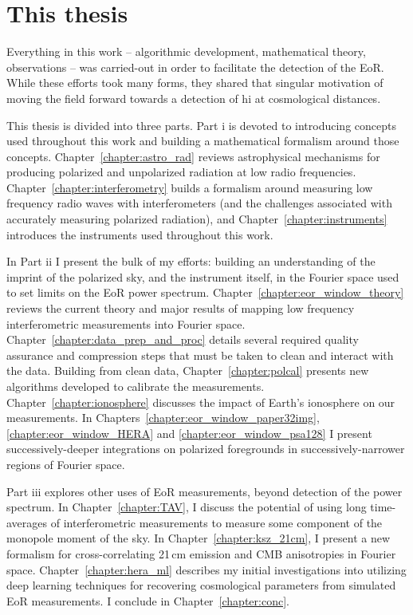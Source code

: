 

\section{This thesis}
\label{sec:eor_intro_this_thesis}
Everything in this work -- algorithmic development, mathematical theory, observations -- was carried-out in order to facilitate the detection of the EoR. While these efforts took many forms, they shared that singular motivation of moving the field forward towards a detection of {\sc hi} at cosmological distances. 

This thesis is divided into three parts. Part {\sc i} is devoted to introducing concepts used throughout this work and building a mathematical formalism around those concepts. 
Chapter~\ref{chapter:astro_rad} reviews astrophysical mechanisms for producing polarized and unpolarized radiation at low radio frequencies. 
Chapter~\ref{chapter:interferometry} builds a formalism around measuring low frequency radio waves with interferometers (and the challenges associated with accurately measuring polarized radiation), and Chapter~\ref{chapter:instruments} introduces the instruments used throughout this work.

In Part {\sc ii} I present the bulk of my efforts: building an understanding of the imprint of the polarized sky, and the instrument itself, in the Fourier space used to set limits on the EoR power spectrum. 
Chapter~\ref{chapter:eor_window_theory} reviews the current theory and major results of mapping low frequency interferometric measurements into Fourier space. 
Chapter~\ref{chapter:data_prep_and_proc} details several required quality assurance and compression steps that must be taken to clean and interact with the data. Building from clean data, Chapter~\ref{chapter:polcal} presents new algorithms developed to calibrate the measurements.
Chapter~\ref{chapter:ionosphere} discusses the impact of Earth's ionosphere on our measurements.
In Chapters~\ref{chapter:eor_window_paper32img}, \ref{chapter:eor_window_HERA} and \ref{chapter:eor_window_psa128} I present successively-deeper integrations on polarized foregrounds in successively-narrower regions of Fourier space.

Part {\sc iii} explores other uses of EoR measurements, beyond detection of the power spectrum. In Chapter~\ref{chapter:TAV}, I discuss the potential of using long time-averages of interferometric measurements to measure some component of the monopole moment of the sky. In Chapter~\ref{chapter:ksz_21cm}, I present a new formalism for cross-correlating 21\,cm emission and CMB anisotropies in Fourier space. Chapter~\ref{chapter:hera_ml} describes my initial investigations into utilizing deep learning techniques for recovering cosmological parameters from simulated EoR measurements. I conclude in Chapter~\ref{chapter:conc}.
